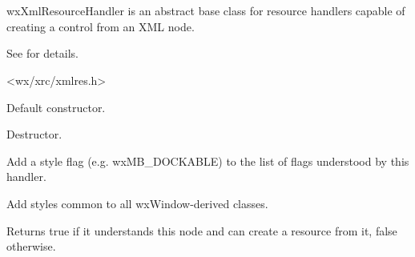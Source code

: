 %
%

\section{}\label{wxxmlresourcehandler}

wxXmlResourceHandler is an abstract base class for resource handlers
capable of creating a control from an XML node.

See  for details.




<wx/xrc/xmlres.h>


\label{wxxmlresourcehandlerwxxmlresourcehandler}


Default constructor.

\label{wxxmlresourcehandlerdtor}


Destructor.

\label{wxxmlresourcehandleraddstyle}


Add a style flag (e.g. wxMB\_DOCKABLE) to the list of flags
understood by this handler.

\label{wxxmlresourcehandleraddwindowstyles}


Add styles common to all wxWindow-derived classes.

\label{wxxmlresourcehandlercanhandle}


Returns true if it understands this node and can create
a resource from it, false otherwise.


